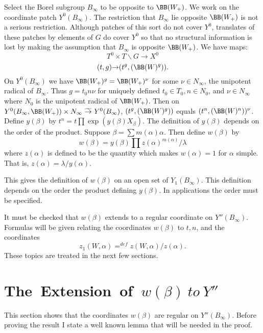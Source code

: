 \documentclass{memo-l}
\theoremstyle{definition}
\theoremstyle{remark}
\numberwithin{section}{chapter}
\numberwithin{equation}{chapter}
\begin{document}
   Select the Borel subgroup $B_{{\infty}}$ to be opposite to 
${\BB}(W_{+})$. 
 We work on the coordinate patch $Y^{0}(B_{{\infty}})$. 
 The restriction that $B_{{\infty}}$ lie opposite ${\BB}(W_{+})$ is not a 
serious restriction. 
 Although patches of this sort do not cover $Y^{0}$, translates of these 
patches by elements of $G$ do cover $Y^{0}$ so that no structural information 
is lost by making the assumption that $B_{{\infty}}$ is opposite 
${\BB}(W_{+})$. 
 We have maps:
$$
T^{0} \times T\backslash G {\to} X^{0}
$$
$$
(t,g) {\to} (t^{g},({\BB}(W)^{g})) .
$$
On $Y^{0}(B_{{\infty}})$ we have ${\BB}(W_{+})^{g} = 
{\BB}(W_{+})^{{\nu}}$ for some ${\nu} \in N_{{\infty}}$, the unipotent 
radical of $B_{{\infty}}$. 
 Thus $g=t_{0}n{\nu}$ for uniquely defined $t_{0} \in T_{0}, n \in N_{0}$, 
and ${\nu} \in N_{{\infty}}$ where $N_{0}$ is the unipotent radical of 
${\BB}(W_{+})$. 
 Then on $Y^{0}(B_{{\infty}},{\BB}(W_{+})) \times N_{{\infty}}\
{\widetilde{\to}}\  Y^{0}(B_{{\infty}})$, $(t^{g},({\BB}(W)^{g}))$ equals 
$(t^{n},({\BB}(W)^{n}))^{{\nu}}$. 
 Define $y({\beta})$ by $t^{n} = t \prod \exp(y({\beta})X_{{\beta}})$. 
 The definition of $y({\beta})$ depends on the order of the product. 
 Suppose ${\beta} = \sum m({\alpha}){\alpha}$. 
 Then define $w({\beta})$ by
$$
w({\beta}) = y({\beta})
\prod z({\alpha})^{m({\alpha})}/{\lambda}
$$
where $z({\alpha})$ is defined to be the quantity which makes $w({\alpha}) = 1$ 
for ${\alpha}$ simple. 
 That is, $z({\alpha}) = {\lambda}/y({\alpha})$.

   This gives the definition of $w({\beta})$ on an open set of 
$Y_{1}(B_{{\infty}})$. 
 This definition depends on the order the product defining $y({\beta})$. 
 In applications the order must be specified. 
 

   It must be checked that $w({\beta})$ extends to a regular coordinate on 
$Y''(B_{{\infty}})$. 
 Formulas will be given relating the coordinates $w({\beta})$ to $t, n$, and 
the coordinates $$z_{1}(W,{\alpha}) =^{def} 
z(W,{\alpha})/z({\alpha}).$$ 
 These topics are treated in the next few sections.

\section{The\ Extension\ of\ $w({\beta})\ to\ Y''$}

   This section shows that the coordinates $w({\beta})$ are regular on 
$Y''(B_{{\infty}})$. 
 Before proving the result I state a well known lemma that will be needed in 
the proof.
\end{document}
